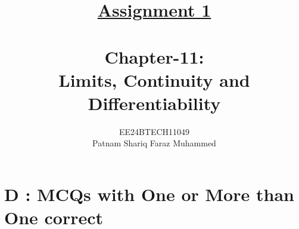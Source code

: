 \documentclass[journal,12pt,twocolumn]{IEEEtran}
\theoremstyle{remark}
\renewcommand{\thefigure}{\theenumi}
\renewcommand{\thetable}{\theenumi}
\begin{document}


\title{{\uline{Assignment 1 \\ } \\}Chapter-11: \\Limits, Continuity and Differentiability}
\author{{EE24BTECH11049 \\ Patnam Shariq Faraz Muhammed}}


 
\maketitle
\newpage
\bigskip

\renewcommand{\thefigure}{\theenumi}
\renewcommand{\thetable}{\theenumi}

\section*{D : MCQs with One or More than One correct}
\end{document}
